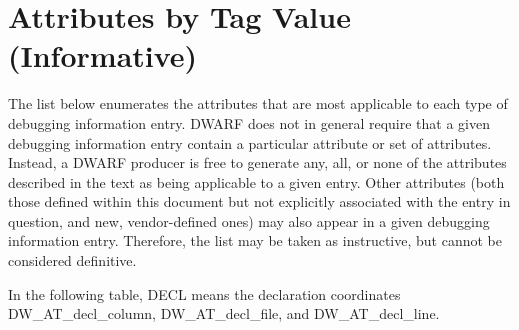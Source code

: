 \chapter[Attributes by Tag (Informative)]{Attributes by Tag Value (Informative)}
\label{chap:attributesbytagvalueinformative}

The list below enumerates the attributes that are
most applicable to each type of debugging information
entry. DWARF does not in general require that a given
debugging information entry contain a particular attribute
or set of attributes. Instead, a DWARF producer is free to
generate any, all, or none of the attributes described in the
text as being applicable to a given entry. Other attributes
(both those defined within this document but not explicitly
associated with the entry in question, and new, vendor-defined
ones) may also appear in a given debugging information
entry. Therefore, the list may be taken as instructive, but
cannot be considered definitive.  

In the following table,
DECL means the declaration coordinates DW\_AT\_decl\_column,
DW\_AT\_decl\_file, and DW\_AT\_decl\_line.


